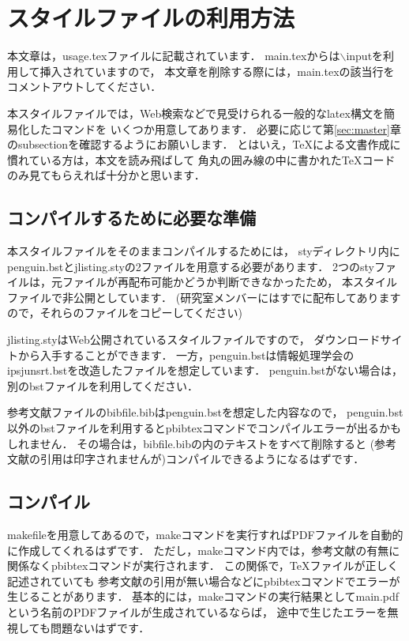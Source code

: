 %
%

\section{スタイルファイルの利用方法}
\label{sec:usage}

本文章は，usage.texファイルに記載されています．
main.texからは$\backslash$inputを利用して挿入されていますので，
本文章を削除する際には，main.texの該当行をコメントアウトしてください．

本スタイルファイルでは，Web検索などで見受けられる一般的なlatex構文を簡易化したコマンドを
いくつか用意してあります．
必要に応じて第\ref{sec:master}章のsubsectionを確認するようにお願いします．
とはいえ，TeXによる文書作成に慣れている方は，本文を読み飛ばして
角丸の囲み線の中に書かれたTeXコードのみ見てもらえれば十分かと思います．

\subsection{コンパイルするために必要な準備}
本スタイルファイルをそのままコンパイルするためには，
styディレクトリ内にpenguin.bstとjlisting.styの2ファイルを用意する必要があります．
2つのstyファイルは，元ファイルが再配布可能かどうか判断できなかったため，
本スタイルファイルで非公開としています．
(研究室メンバーにはすでに配布してありますので，それらのファイルをコピーしてください)

jlisting.styはWeb公開されているスタイルファイルですので，
ダウンロードサイトから入手することができます．
一方，penguin.bstは情報処理学会のipsjunsrt.bstを改造したファイルを想定しています．
penguin.bstがない場合は，別のbstファイルを利用してください．

参考文献ファイルのbibfile.bibはpenguin.bstを想定した内容なので，
penguin.bst以外のbstファイルを利用するとpbibtexコマンドでコンパイルエラーが出るかもしれません．
その場合は，bibfile.bibの内のテキストをすべて削除すると
(参考文献の引用は印字されませんが)コンパイルできるようになるはずです．
\subsection{コンパイル}
makefileを用意してあるので，makeコマンドを実行すればPDFファイルを自動的に作成してくれるはずです．
ただし，makeコマンド内では，参考文献の有無に関係なくpbibtexコマンドが実行されます．
この関係で，TeXファイルが正しく記述されていても
参考文献の引用が無い場合などにpbibtexコマンドでエラーが生じることがあります．
基本的には，makeコマンドの実行結果としてmain.pdfという名前のPDFファイルが生成されているならば，
途中で生じたエラーを無視しても問題ないはずです．

